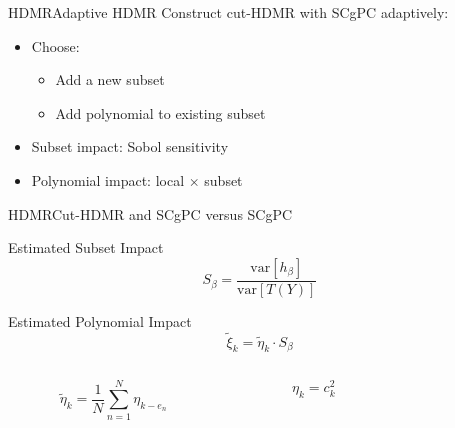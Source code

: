 \documentclass{beamer}
\begin{document}
\begin{frame}{HDMR}{Adaptive HDMR}\vspace{-20pt}
  \vfill
  Construct cut-HDMR with SCgPC adaptively:
  \vfill
  \begin{itemize}
    \item Choose:
      \begin{itemize}
        \item Add a new subset
        \item Add polynomial to existing subset
      \end{itemize}
  \vfill
    \item Subset impact: Sobol sensitivity
  \vfill
    \item Polynomial impact: local $\times$ subset
  \end{itemize}
  \vfill
\end{frame}

\begin{frame}{HDMR}{Cut-HDMR and SCgPC versus SCgPC}
  \begin{block}{Estimated Subset Impact}
    \begin{equation*}
      S_\beta = \frac{\text{var}[h_\beta]}{\text{var}[T(Y)]}
    \end{equation*}
  \end{block}
  \begin{block}{Estimated Polynomial Impact}
    \begin{equation*}
      \tilde \xi_k = \tilde \eta_k\cdot S_\beta
    \end{equation*}
  \end{block}
  \begin{columns}
    \begin{column}{0.4\textwidth}
      \begin{equation*}
        \tilde \eta_k = \frac{1}{N}\sum_{n=1}^N \eta_{k-e_n}
      \end{equation*}
    \end{column}
    \begin{column}{0.4\textwidth}
      \begin{equation*}
        \eta_k = c_k^2
      \end{equation*}
    \end{column}
    \begin{column}{0.2\textwidth}
    \end{column}
  \end{columns}
\end{frame}
\end{document}
